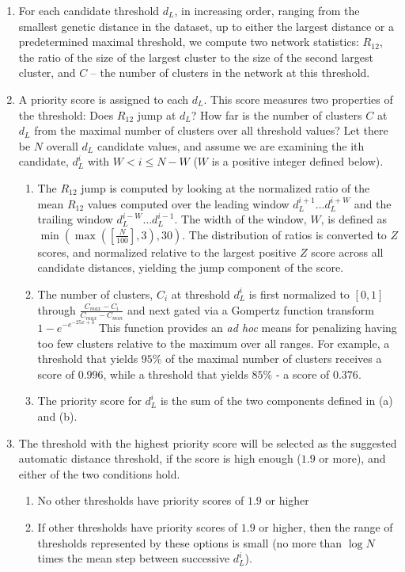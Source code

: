 \documentclass[utf8]{FrontiersinHarvard} %
\begin{document}
\begin{enumerate}
	\item{For each candidate threshold $d_L$, in increasing order, ranging from the smallest genetic distance in the dataset, up to either the largest distance or a predetermined maximal threshold, we compute two network statistics: $R_{12}$, the ratio of the size of the largest cluster to the size of the second largest cluster, and $C$ – the number of clusters in the network at this threshold.}

	\item{ A priority score is assigned to each $d_L$. This score measures two properties of the threshold: Does $R_{12}$ jump at $d_L$? How far is the number of clusters $C$ at $d_L$ from the maximal number of clusters over all threshold values? Let there be $N$ overall $d_L$ candidate values, and assume we are examining the ith candidate, $d_L^i$ with $W < i \leq N - W$ ($W$ is a positive integer defined below).

	            \begin{enumerate}
		            \item{The $R_{12}$ jump is computed by looking at the normalized ratio of the mean $R_{12}$ values computed over the leading window $d_L^{i+1}…d_L^{i+W}$ and the trailing window $d_L^{i-W}… d_L^{i-1}$. The width of the window, $W$, is defined as $\min \left( \max \left(\left[\frac{N}{100}\right], 3\right), 30 \right)$. The distribution of ratios is converted to $Z$ scores, and normalized relative to the largest positive $Z$ score across all candidate distances, yielding the jump component of the score.}
		            \item{The number of clusters, $C_i$ at threshold $d_L^i$ is first normalized to $[0,1]$ through $\frac{{C_{max} - C_i}}{{C_{max} -C_{min}}}$ and next gated via a Gompertz function transform ${1-e}^{-e^{-25x+3}}$ This function provides an \emph{ad hoc} means for penalizing having too few clusters relative to the maximum over all ranges. For example, a threshold that yields $95\%$ of the maximal number of clusters receives a score of $0.996$, while a threshold that yields $85\%$ - a score of $0.376$.}
		            \item{The priority score for $d_L^i$ is the sum of the two components defined in (a) and (b).}
	            \end{enumerate}}

	\item{The threshold with the highest priority score will be selected as the suggested automatic distance threshold, if the score is high enough ($1.9$ or more), and either of the two conditions hold.
	            \begin{enumerate}
		            \item{No other thresholds have priority scores of $1.9$ or higher}
		            \item{If other thresholds have priority scores of $1.9$ or higher, then the range of thresholds represented by these options is small (no more than $\log N$ times the mean step between successive $d_L^i$).}
	            \end{enumerate}}


\end{enumerate}
\end{document}
